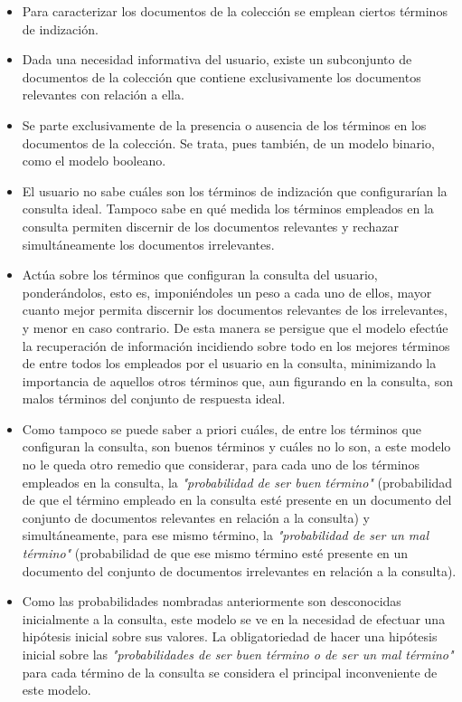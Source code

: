 \documentclass{article}
\begin{document}
\begin{itemize}
	\item Para caracterizar los documentos de la colección se emplean ciertos términos de indización.
	
	\item Dada una necesidad informativa del usuario, existe un subconjunto de documentos de la colección que contiene exclusivamente los documentos relevantes con relación a ella.
	
	\item Se parte exclusivamente de la presencia o ausencia de los términos en los documentos de la colección. Se trata, pues también, de un modelo binario, como el modelo booleano.
	
	\item El usuario no sabe cuáles son los términos de indización que configurarían la consulta ideal. Tampoco sabe en qué medida los términos empleados en la consulta permiten discernir de los documentos relevantes y rechazar simultáneamente los documentos irrelevantes.
	
	\item Actúa sobre los términos que configuran la consulta del usuario, ponderándolos, esto es, imponiéndoles un peso a cada uno de ellos, mayor cuanto mejor permita discernir los documentos relevantes de los irrelevantes, y menor en caso contrario. De esta manera se persigue que el modelo efectúe la recuperación de información incidiendo sobre todo en los mejores términos de entre todos los empleados por el usuario en la consulta, minimizando la importancia de aquellos otros términos que, aun figurando en la consulta, son malos términos del conjunto de respuesta ideal.
	
	\item Como tampoco se puede saber a priori cuáles, de entre los términos que configuran la consulta, son buenos términos y cuáles no lo son, a este modelo no le queda otro remedio que considerar, para cada uno de los términos empleados en la consulta, la \textit{"probabilidad de ser buen término"} (probabilidad de que el término empleado en la consulta esté presente en un documento del conjunto de documentos relevantes en relación a la consulta) y simultáneamente, para ese mismo término, la \textit{"probabilidad de ser un mal término"} (probabilidad de que ese mismo término esté presente en un documento del conjunto de documentos irrelevantes en relación a la consulta).
	
	\item Como las probabilidades nombradas anteriormente son desconocidas inicialmente a la consulta, este modelo se ve en la necesidad de efectuar una hipótesis inicial sobre sus valores. La obligatoriedad de hacer una hipótesis inicial sobre las \textit{"probabilidades de ser buen término o de ser un mal término"} para cada término de la consulta se considera el principal inconveniente de este modelo. 
\end{itemize}
\end{document}
